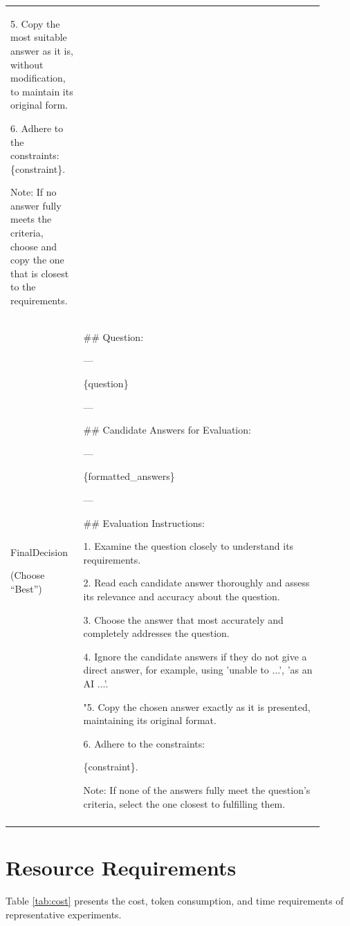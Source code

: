 \documentclass{article}
\theoremstyle{plain}
\theoremstyle{definition}
\theoremstyle{remark}
\begin{document}
\begin{table}[t!]
\begin{tabular}{|p{0.2\linewidth}|p{0.7\linewidth}|}
5. Copy the most suitable answer as it is, without modification, to maintain its original form.

6. Adhere to the constraints: \{constraint\}.


Note: If no answer fully meets the criteria, choose and copy the one that is closest to the requirements. 
   \\  \Xhline{1.2pt}
   FinalDecision 
   
   (Choose ``Best'')
    &  \#\#  Question:

---

\{question\}

---

\#\#  Candidate Answers for Evaluation:

---

\{formatted\_answers\}

---

\#\#  Evaluation Instructions:

1. Examine the question closely to understand its requirements.

2. Read each candidate answer thoroughly and assess its relevance and accuracy about the question.

3. Choose the answer that most accurately and completely addresses the question.

4. Ignore the candidate answers if they do not give a direct answer, for example, using 'unable to ...', 'as an AI ...'.

"5. Copy the chosen answer exactly as it is presented, maintaining its original format.

6. Adhere to the constraints: 

\{constraint\}.


Note: If none of the answers fully meet the question's criteria, select the one closest to fulfilling them. 
 \\
    \Xhline{1.2pt}
  \end{tabular}
\end{table}

\section{Resource Requirements}
Table \ref{tab:cost} presents the cost, token consumption, and time requirements of representative experiments. 
\end{document}

